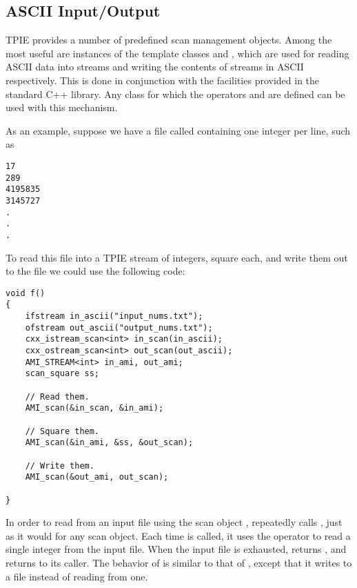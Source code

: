 \subsection{ASCII Input/Output} \label{sec:ascii-io}

TPIE provides a number of predefined scan management objects.  Among
the most useful are instances of the template classes
 and , which are
used for reading ASCII data into streams and writing the contents of
streams in ASCII respectively.  This is done in conjunction with the
 facilities provided in the standard C++ library.  Any
class  for which the operators  and 
are defined can be used with this mechanism.

As an example, suppose we have a file called 
containing one integer per line, such as

\begin{verbatim}
17
289
4195835
3145727
.
.
.
\end{verbatim}

To read this file into a TPIE stream of integers, square each, and
write them out to the file  we could use the
following code:

\begin{verbatim}
void f()
{
    ifstream in_ascii("input_nums.txt");
    ofstream out_ascii("output_nums.txt");
    cxx_istream_scan<int> in_scan(in_ascii);
    cxx_ostream_scan<int> out_scan(out_ascii);
    AMI_STREAM<int> in_ami, out_ami;
    scan_square ss;    

    // Read them.
    AMI_scan(&in_scan, &in_ami);

    // Square them.
    AMI_scan(&in_ami, &ss, &out_scan);
    
    // Write them.
    AMI_scan(&out_ami, out_scan);

}    
\end{verbatim}

In order to read from an input file using the scan object
,  repeatedly calls
, just as it would for any scan
object.  Each time  is called,
it uses the \myverb{>>} operator to read a single integer
from the input file.  When the input file is exhausted,
 returns
, and  returns
to its caller.  The behavior of  is
similar to that of , except that it writes
to a file instead of reading from one.

